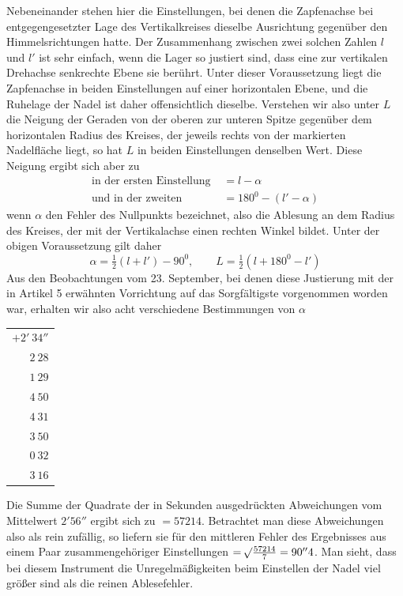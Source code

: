 Nebeneinander stehen hier die Einstellungen, bei denen die Zapfenachse bei entgegengesetzter Lage des Vertikalkreises dieselbe Ausrichtung gegenüber den Himmelsrichtungen hatte. Der Zusammenhang zwischen zwei solchen Zahlen $l$ und $l'$ ist sehr einfach, wenn die Lager so justiert sind, dass eine zur vertikalen Drehachse senkrechte Ebene sie berührt. Unter dieser Voraussetzung liegt die Zapfenachse in beiden Einstellungen auf einer horizontalen Ebene, und die Ruhelage der Nadel ist daher offensichtlich dieselbe. Verstehen wir also unter $L$ die Neigung der Geraden von der oberen zur unteren Spitze gegenüber dem horizontalen Radius des Kreises, der jeweils rechts von der markierten Nadelfläche liegt, so hat $L$ in beiden Einstellungen denselben Wert. Diese Neigung ergibt sich aber zu
\[
\begin{aligned}
\text{in der ersten Einstellung }&=l-\alpha\\
\text{und in der zweiten }&=180^0-(l'-\alpha)
\end{aligned}
\]
wenn $\alpha$ den Fehler des Nullpunkts bezeichnet, also die Ablesung an dem Radius des Kreises, der mit der Vertikalachse einen rechten Winkel bildet. Unter der obigen Voraussetzung gilt daher
\[
\alpha=\tfrac{1}{2}(l+l')-90^0,\qquad L=\tfrac{1}{2}(l+180^0-l')
\]
Aus den Beobachtungen vom 23. September, bei denen diese Justierung mit der in Artikel 5 erwähnten Vorrichtung auf das Sorgfältigste vorgenommen worden war, erhalten wir also acht verschiedene Bestimmungen von $\alpha$
\begin{center}
\begin{tabular}{r}
$+2'\ 34''$\\
$2\ 28$\\
$1\ 29$\\
$4\ 50$\\
$4\ 31$\\
$3\ 50$\\
$0\ 32$\\
$3\ 16$
\end{tabular}
\end{center}

Die Summe der Quadrate der in Sekunden ausgedrückten Abweichungen vom Mittelwert $2'56''$ ergibt sich zu $=57214$. Betrachtet man diese Abweichungen also als rein zufällig, so liefern sie für den mittleren Fehler des
Ergebnisses aus einem Paar zusammengehöriger Einstellungen $=\mathord{{}^{}\!\surd}\frac{57214}{7}=90''4$. Man sieht, dass bei diesem Instrument die Unregelmäßigkeiten beim Einstellen der Nadel viel größer sind als die reinen Ablesefehler.


